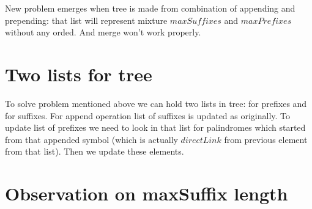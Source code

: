 New problem emerges when tree is made from combination of appending and prepending: that list will represent mixture $maxSuffixes$ and $maxPrefixes$ without any orded. And merge won't work properly.
\section{Two lists for tree}
To solve problem mentioned above we can hold two lists in tree: for prefixes and for suffixes. For append operation list of suffixes is updated as originally. To update list of prefixes we need to look in that list for palindromes which started from that appended symbol (which is actually $directLink$ from previous element from that list). Then we update these elements. 
\section{Observation on maxSuffix length}
